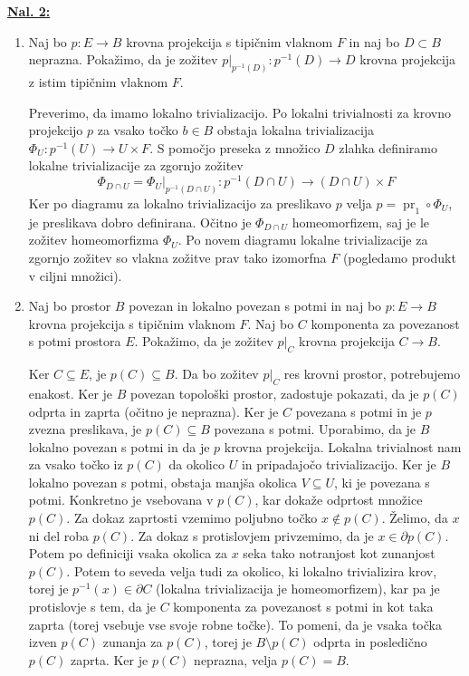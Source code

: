 \documentclass[a4paper, 12pt]{article}
\DeclareMathOperator{\pr}{pr}
\begin{document}
\underline{\textbf{Nal. 2:}}
\begin{enumerate}[label=(\alph*)]
	\item Naj bo $p \colon E \to B$ krovna projekcija s tipičnim vlaknom $F$ in naj bo $D \subset B$ neprazna. Pokažimo, da je zožitev $p|_{p^{-1}(D)} \colon p^{-1}(D) \to D$ krovna projekcija z istim tipičnim vlaknom $F$.
	
	Preverimo, da imamo lokalno trivializacijo. Po lokalni trivialnosti za krovno projekcijo $p$ za vsako točko $b \in B$ obstaja lokalna trivializacija $\Phi_U \colon p^{-1}(U) \to U \times F$. S pomočjo preseka z množico $D$ zlahka definiramo lokalne trivializacije za zgornjo zožitev
	\[
	\Phi_{D \cap U} = \Phi_U|_{p^{-1}(D \cap U)}\colon p^{-1}(D \cap U) \to (D \cap U) \times F
	\]
	Ker po diagramu za lokalno trivializacijo za preslikavo $p$ velja $p = \pr_1 \circ \Phi_U$, je preslikava dobro definirana. Očitno je $\Phi_{D \cap U}$ homeomorfizem, saj je le zožitev homeomorfizma $\Phi_U$. Po novem diagramu lokalne trivializacije za zgornjo zožitev so vlakna zožitve prav tako izomorfna $F$ (pogledamo produkt v ciljni množici).
	
	\item Naj bo prostor $B$ povezan in lokalno povezan s potmi in naj bo $p \colon E \to B$ krovna projekcija s tipičnim vlaknom $F$. Naj bo $C$ komponenta za povezanost s potmi prostora $E$. Pokažimo, da je zožitev $p|_C$ krovna projekcija $C \to B$.
	
	Ker $C \subseteq E$, je $p(C) \subseteq B$. Da bo zožitev $p|_C$ res krovni prostor, potrebujemo enakost. Ker je $B$ povezan topološki prostor, zadostuje pokazati, da je $p(C)$ odprta in zaprta (očitno je neprazna). Ker je $C$ povezana s potmi in je $p$ zvezna preslikava, je $p(C) \subseteq B$ povezana s potmi. Uporabimo, da je $B$ lokalno povezan s potmi in da je $p$ krovna projekcija. Lokalna trivialnost nam za vsako točko iz $p(C)$ da okolico $U$ in pripadajočo trivializacijo. Ker je $B$ lokalno povezan s potmi, obstaja manjša okolica $V \subseteq U$, ki je povezana s potmi. Konkretno je vsebovana v $p(C)$, kar dokaže odprtost množice $p(C)$. Za dokaz zaprtosti vzemimo poljubno točko $x \notin p(C)$. Želimo, da $x$ ni del roba $p(C)$. Za dokaz s protislovjem privzemimo, da je $x \in \partial p(C)$. Potem po definiciji vsaka okolica za $x$ seka tako notranjost kot zunanjost $p(C)$. Potem to seveda velja tudi za okolico, ki lokalno trivializira krov, torej je $p^{-1}(x) \in \partial C$ (lokalna trivializacija je homeomorfizem), kar pa je protislovje s tem, da je $C$ komponenta za povezanost s potmi in kot taka zaprta (torej vsebuje vse svoje robne točke). To pomeni, da je vsaka točka izven $p(C)$ zunanja za $p(C)$, torej je $B \setminus p(C)$ odprta in posledično $p(C)$ zaprta. Ker je $p(C)$ neprazna, velja $p(C) = B$.
	

\end{enumerate}
\end{document}

